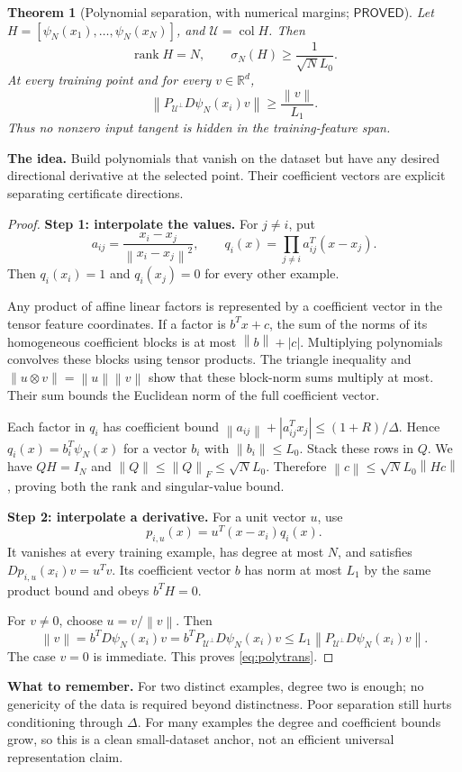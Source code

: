 \documentclass[12pt,a4paper]{article}
\theoremstyle{readable}
\newtheorem{theorem}{Theorem}[section]
\theoremstyle{definition}\newtheorem{example}[theorem]{Example}
\newcommand{\R}{\mathbb R}\newcommand{\rank}{\operatorname{rank}}
\newcommand{\col}{\operatorname{col}}\newcommand{\row}{\operatorname{row}}
\newcommand{\norm}[1]{\left\|#1\right\|}
\newcommand{\PP}{\mathsf{PROVED}}\newcommand{\FF}{\mathsf{FALSE}}
\newcommand{\idea}[1]{\par\textbf{The idea.} #1\par}
\newcommand{\takeaway}[1]{\par\textbf{What to remember.} #1\par}
\begin{document}
\begin{theorem}[Polynomial separation, with numerical margins; \(\PP\)]\label{thm:poly}
Let \(H=[\psi_N(x_1),\ldots,\psi_N(x_N)]\), and \(\mathcal U=\col H\). Then
\[
\rank H=N,\qquad \sigma_N(H)\ge\frac1{\sqrt N L_0}.
\]
At every training point and for every \(v\in\R^d\),
\begin{equation}\label{eq:polytrans}
\norm{P_{\mathcal U^\perp}D\psi_N(x_i)v}\ge\frac{\norm v}{L_1}.
\end{equation}
Thus no nonzero input tangent is hidden in the training-feature span.
\end{theorem}
\idea{Build polynomials that vanish on the dataset but have any desired directional derivative at the selected point. Their coefficient vectors are explicit separating certificate directions.}
\begin{proof}
\textbf{Step 1: interpolate the values.} For \(j\ne i\), put
\[
a_{ij}=\frac{x_i-x_j}{\norm{x_i-x_j}^2},\qquad
q_i(x)=\prod_{j\ne i}a_{ij}^T(x-x_j).
\]
Then \(q_i(x_i)=1\) and \(q_i(x_j)=0\) for every other example.

Any product of affine linear factors is represented by a coefficient vector in the tensor feature coordinates. If a factor is \(b^Tx+c\), the sum of the norms of its homogeneous coefficient blocks is at most \(\norm b+|c|\). Multiplying polynomials convolves these blocks using tensor products. The triangle inequality and \(\norm{u\otimes v}=\norm u\norm v\) show that these block-norm sums multiply at most. Their sum bounds the Euclidean norm of the full coefficient vector.

Each factor in \(q_i\) has coefficient bound
\(\norm{a_{ij}}+|a_{ij}^Tx_j|\le(1+R)/\Delta\).
Hence \(q_i(x)=b_i^T\psi_N(x)\) for a vector \(b_i\) with \(\norm{b_i}\le L_0\). Stack these rows in \(Q\). We have \(QH=I_N\) and \(\norm Q\le\norm Q_F\le\sqrt N L_0\). Therefore
\(\norm c\le\sqrt N L_0\norm{Hc}\), proving both the rank and singular-value bound.

\textbf{Step 2: interpolate a derivative.} For a unit vector \(u\), use
\[
p_{i,u}(x)=u^T(x-x_i)q_i(x).
\]
It vanishes at every training example, has degree at most \(N\), and satisfies
\(Dp_{i,u}(x_i)v=u^Tv\). Its coefficient vector \(b\) has norm at most \(L_1\) by the same product bound and obeys \(b^TH=0\).

For \(v\ne0\), choose \(u=v/\norm v\). Then
\[
\norm v=b^TD\psi_N(x_i)v
=b^TP_{\mathcal U^\perp}D\psi_N(x_i)v
\le L_1\norm{P_{\mathcal U^\perp}D\psi_N(x_i)v}.
\]
The case \(v=0\) is immediate. This proves \eqref{eq:polytrans}.
\end{proof}
\takeaway{For two distinct examples, degree two is enough; no genericity of the data is required beyond distinctness. Poor separation still hurts conditioning through \(\Delta\). For many examples the degree and coefficient bounds grow, so this is a clean small-dataset anchor, not an efficient universal representation claim.}
\end{document}
